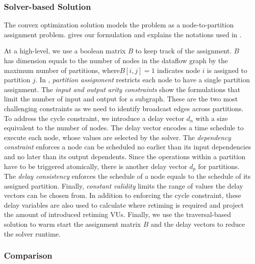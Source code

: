 \subsubsection{Solver-based Solution}
The convex optimization solution models the problem as a node-to-partition assignment problem.
 gives our formulation and  explains the notations
used in .



At a high-level, we use a boolean matrix $B$ to keep track of the assignment. 
$B$ has dimension equals to the number of nodes in the dataflow graph by the maximum number of partitions, where$B[i,j]=1$ 
indicates node $i$ is assigned to partition $j$.
In , \emph{partition assignment} restricts each node to have a single partition assignment.
The \emph{input and output arity constraints} show the formulations that limit the number of input
and output for a subgraph.
These are the two most challenging constraints as we need to identify broadcast edges across partitions.
To address the cycle constraint, we introduce a delay vector $d_n$ with a size equivalent to the number of nodes. 
The delay vector encodes a time schedule to execute each node, whose values are selected by the solver.
The \emph{dependency constraint} enforces a node can be scheduled no earlier than its input dependencies and
no later than its output dependents.
Since the operations within a partition have to be triggered atomically, there is another delay
vector $d_p$ for partitions. The \emph{delay consistency} enforces the schedule of a node equals to the
schedule of its assigned partition.
Finally, \emph{constant validity} limits the range of values the delay vectors can be chosen from.
In addition to enforcing the cycle constraint, 
these delay variables are also used to calculate where retiming is required and project the amount of introduced retiming VUs. 
Finally, we use the traversal-based solution to warm start the assignment matrix
$B$ and the delay vectors to reduce the solver runtime.

\subsubsection{Comparison}

